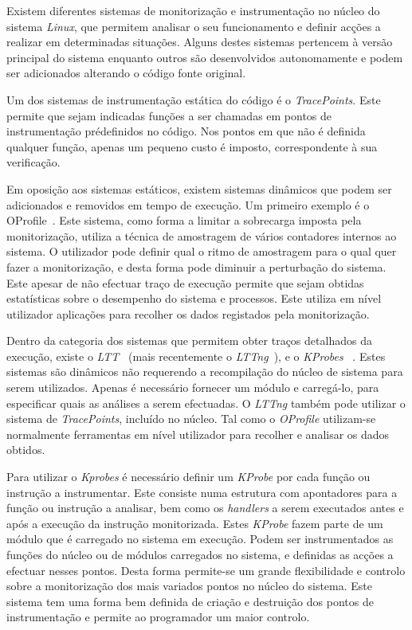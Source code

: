 \documentclass[a4paper]{llncs}
\newcommand{\td}[1]{\todo[inline]{#1}}
\begin{document}
Existem diferentes sistemas de monitorização e instrumentação no núcleo do sistema \textit{Linux}, que permitem analisar o seu funcionamento e definir acções a realizar em determinadas situações. Alguns destes sistemas pertencem à versão principal do sistema enquanto outros são desenvolvidos autonomamente e podem ser adicionados alterando o código fonte original. 

Um dos sistemas de instrumentação estática do código é o \textit{TracePoints}. Este permite que sejam indicadas funções a ser chamadas em pontos de instrumentação prédefinidos no código. Nos pontos em que não é definida qualquer função, apenas um pequeno custo é imposto, correspondente à sua verificação. 

Em oposição aos sistemas estáticos, existem sistemas dinâmicos que podem  ser adicionados e removidos em tempo de execução. Um primeiro exemplo é o OProfile~\cite{oprofile}. 
Este sistema, como forma a limitar a sobrecarga imposta pela monitorização, utiliza a técnica de amostragem de vários contadores internos ao sistema. O utilizador pode definir qual o ritmo de amostragem para o qual quer fazer a monitorização, e desta forma pode diminuir a perturbação do sistema. Este apesar de não efectuar traço de execução permite que sejam obtidas estatísticas sobre o desempenho do sistema e processos. Este  utiliza em nível utilizador aplicações para recolher os dados registados pela monitorização.

Dentro da categoria dos sistemas que permitem obter traços detalhados da execução, existe o \textit{LTT}~\cite{ltt} (mais recentemente o \textit{LTTng}~\cite{Mathieu2009}), e o \textit{KProbes} ~\cite{KProbesSite,kernel_debug_printk_on_fly}. %
Estes sistemas são dinâmicos não requerendo a recompilação do núcleo de sistema para serem utilizados. Apenas é necessário fornecer um módulo  e carregá-lo, para  especificar quais as análises a serem efectuadas. O \textit{LTTng} também pode utilizar o sistema de \textit{TracePoints}, incluído no núcleo. Tal como o \textit{OProfile} utilizam-se normalmente ferramentas em nível utilizador para recolher e analisar os dados obtidos.

Para utilizar o \textit{Kprobes} é necessário definir um \textit{KProbe} por cada função ou instrução a instrumentar. Este consiste numa estrutura com apontadores para a função ou instrução a analisar, bem como os \textit{handlers} a serem executados antes e após a execução da instrução monitorizada. Estes \textit{KProbe} fazem parte de um módulo que é carregado no sistema em execução. 
Podem ser instrumentados as funções do núcleo ou de módulos carregados no sistema, e definidas as acções a efectuar nesses pontos. 
Desta forma permite-se um grande flexibilidade e controlo sobre a monitorização dos mais variados pontos no núcleo do sistema.
Este sistema tem uma forma bem definida de criação e destruição dos pontos de instrumentação e permite ao programador um maior controlo.
\end{document}
